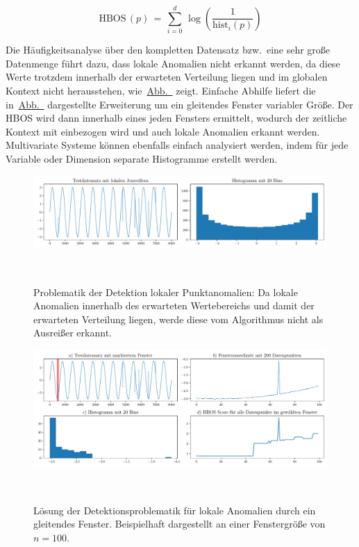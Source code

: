 \begin{equation}
    \text{HBOS}\,(p)\, =\, \sum_{i=0} ^ {d}\, \log \left( \frac{1}{\text{hist}_i(p)} \right)
\label{eq:hbos}
\end{equation}

Die Häufigkeitsanalyse über den kompletten Datensatz bzw.~eine sehr große Datenmenge führt dazu, dass lokale Anomalien nicht erkannt werden,
da diese Werte trotzdem innerhalb der erwarteten Verteilung liegen und im globalen Kontext nicht herausstehen,
wie~\hyperref[fig:hbos_lokale_probleme]{Abb.~} zeigt. Einfache Abhilfe liefert die
in~\hyperref[fig:hbos_lösung]{Abb.~} dargestellte Erweiterung um ein gleitendes Fenster variabler Größe. Der HBOS wird dann innerhalb
eines jeden Fensters ermittelt, wodurch der zeitliche Kontext mit einbezogen wird und auch lokale Anomalien erkannt werden. Multivariate Systeme
können ebenfalls einfach analysiert werden, indem für jede Variable oder Dimension separate Histogramme erstellt werden.

\begin{figure}[H]
    \centering
        \includegraphics[width=1\linewidth]{ch4_anomalien/abbildungen/hbos_lokal_problem.pdf}    
    \caption{\centering Problematik der Detektion lokaler Punktanomalien: Da lokale Anomalien innerhalb des erwarteten Wertebereichs und damit der erwarteten
    Verteilung liegen, werde diese vom Algorithmus nicht als Ausreißer erkannt.}
~\label{fig:hbos_lokale_probleme}
\end{figure}

\begin{figure}[H]
    \centering
        \includegraphics[width=1\linewidth]{ch4_anomalien/abbildungen/hbos_lokale_anomalien.pdf}    
    \caption{\centering Lösung der Detektionsproblematik für lokale Anomalien durch ein gleitendes Fenster. Beispielhaft dargestellt an einer Fenstergröße
    von $n=100$.}
~\label{fig:hbos_lösung}
\end{figure}

